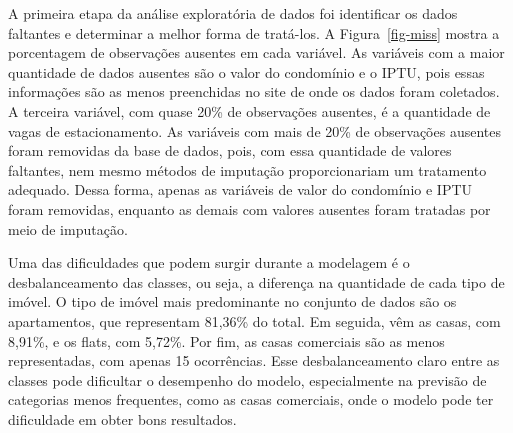 \documentclass[
  12pt,
  a4paper,
]{scrreprt}
\begin{document}
A primeira etapa da análise exploratória de dados foi identificar os
dados faltantes e determinar a melhor forma de tratá-los. A
Figura~\ref{fig-miss} mostra a porcentagem de observações ausentes em
cada variável. As variáveis com a maior quantidade de dados ausentes são
o valor do condomínio e o IPTU, pois essas informações são as menos
preenchidas no site de onde os dados foram coletados. A terceira
variável, com quase 20\% de observações ausentes, é a quantidade de
vagas de estacionamento. As variáveis com mais de 20\% de observações
ausentes foram removidas da base de dados, pois, com essa quantidade de
valores faltantes, nem mesmo métodos de imputação proporcionariam um
tratamento adequado. Dessa forma, apenas as variáveis de valor do
condomínio e IPTU foram removidas, enquanto as demais com valores
ausentes foram tratadas por meio de imputação.

\vspace{12pt}

Uma das dificuldades que podem surgir durante a modelagem é o
desbalanceamento das classes, ou seja, a diferença na quantidade de cada
tipo de imóvel. O tipo de imóvel mais predominante no conjunto de dados
são os apartamentos, que representam 81,36\% do total. Em seguida, vêm
as casas, com 8,91\%, e os flats, com 5,72\%. Por fim, as casas
comerciais são as menos representadas, com apenas 15 ocorrências. Esse
desbalanceamento claro entre as classes pode dificultar o desempenho do
modelo, especialmente na previsão de categorias menos frequentes, como
as casas comerciais, onde o modelo pode ter dificuldade em obter bons
resultados.

\vspace{12pt}
\end{document}
